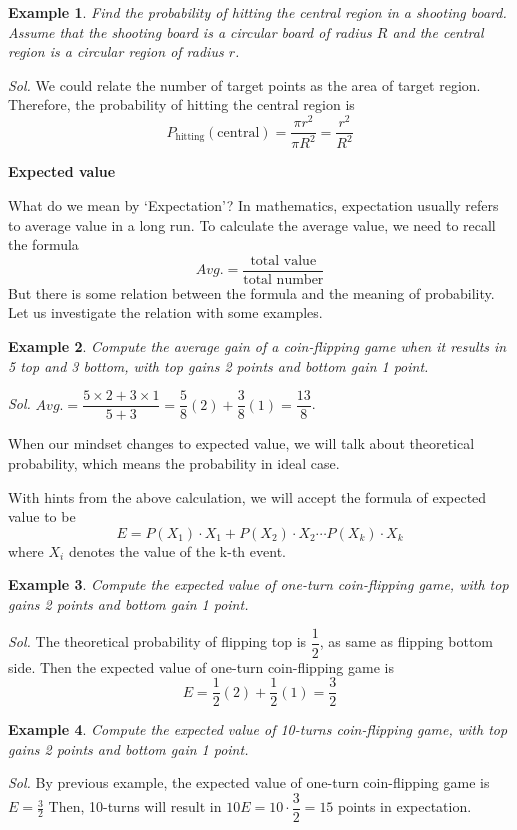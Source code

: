 \documentclass[12pt]{article}
\newtheorem{example}{Example}
\begin{document}
    \begin{example}
        Find the probability of hitting the central region in a shooting board. Assume that the shooting board is a circular board of radius $R$ and the central region is a circular region of radius $r$.
    \end{example}

    \textit{ Sol.} We could relate the number of target points as the area of target region. Therefore, the probability of hitting the central region is $$P_{\textrm{hitting}}(\textrm{central})=\frac{\pi r^2}{\pi R^2}=\frac{r^2}{R^2}$$

    \begin{center}
        \textbf{Expected value}
    \end{center}

    What do we mean by `Expectation'? In mathematics, expectation usually refers to average value in a long run. To calculate the average value, we need to recall the formula $$Avg.=\frac{\textrm{total value}}{\textrm{total number}}$$ But there is some relation between the formula and the meaning of probability. Let us investigate the relation with some examples.

    \begin{example}
        Compute the average gain of a coin-flipping game when it results in 5 top and 3 bottom, with top gains 2 points and bottom gain 1 point.
    \end{example}

    \textit{ Sol.} $Avg.=\dfrac{5\times 2+3\times 1}{5+3}=\dfrac{5}{8}(2)+\dfrac{3}{8}(1)=\dfrac{13}{8}$.

    When our mindset changes to expected value, we will talk about theoretical probability, which means the probability in ideal case.

    With hints from the above calculation, we will accept the formula of expected value to be $$E=P(X_1)\cdot X_1+P(X_2)\cdot X_2\cdots P(X_k)\cdot X_k$$ where $X_i$ denotes the value of the k-th event.

    \begin{example}
        Compute the expected value of one-turn coin-flipping game, with top gains 2 points and bottom gain 1 point.
    \end{example}

    \textit{ Sol.} The theoretical probability of flipping top is $\dfrac{1}{2}$, as same as flipping bottom side. Then the expected value of one-turn coin-flipping game is $$E=\frac{1}{2}(2)+\frac{1}{2}(1)=\frac{3}{2}$$

    \begin{example}
        Compute the expected value of 10-turns coin-flipping game, with top gains 2 points and bottom gain 1 point.
    \end{example}

    \textit{ Sol.} By previous example, the expected value of one-turn coin-flipping game is $E=\frac{3}{2}$ Then, 10-turns will result in $10E=10\cdot\dfrac{3}{2}=15$ points in expectation.
\end{document}
